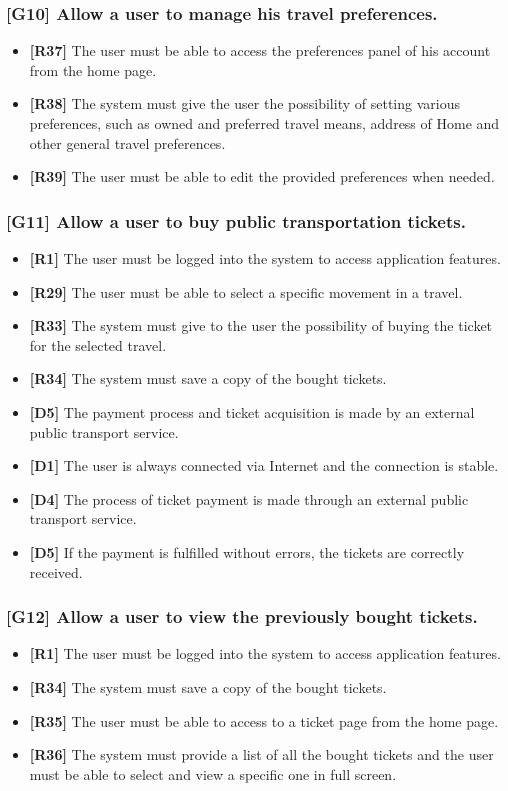 \subsubsection{[G10] Allow a user to manage his travel preferences.}
\begin{itemize}
	\item \textbf{[R37]} The user must be able to access the preferences panel of his account from the home page.
	\item \textbf{[R38]} The system must give the user the possibility of setting various preferences, such as owned and preferred travel means, address of Home and other general travel preferences.
	\item \textbf{[R39]} The user must be able to edit the provided preferences when needed.	
\end{itemize}

\subsubsection{[G11] Allow a user to buy public transportation tickets.}
\begin{itemize}
	\item \textbf{[R1]} The user must be logged into the system to access application features.
	\item \textbf{[R29]} The user must be able to select a specific movement in a travel.
	\item \textbf{[R33]} The system must give to the user the possibility of buying the ticket for the selected travel.
	\item \textbf{[R34]} The system must save a copy of the bought tickets.
	\item \textbf{[D5]} The payment process and ticket acquisition is made by an external public transport service.
	\item \textbf{[D1]} The user is always connected via Internet and the connection is stable.
	\item \textbf{[D4]} The process of ticket payment is made through an external public transport service.
	\item \textbf{[D5]} If the payment is fulfilled without errors, the tickets are correctly received.
\end{itemize}

\subsubsection{[G12] Allow a user to view the previously bought tickets.}
\begin{itemize}
	\item \textbf{[R1]} The user must be logged into the system to access application features.
	\item \textbf{[R34]} The system must save a copy of the bought tickets.
	\item \textbf{[R35]} The user must be able to access to a ticket page from the home page.
	\item \textbf{[R36]} The system must provide a list of all the bought tickets and the user must be able to select and view a specific one in full screen.	
\end{itemize}

